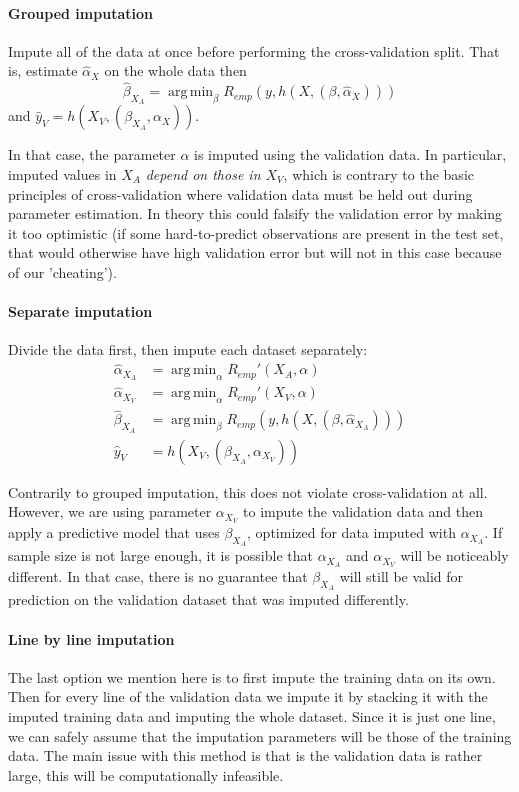 \documentclass[12pt, a4paper]{memoir}
\DeclareMathOperator*{\argmin}{arg\,min}
\begin{document}
\paragraph{Grouped imputation} Impute all of the data at once before performing the cross-validation split. That is, estimate $\hat{\alpha}_X$ on the whole data then $$\hat{\beta}_{X_A} = \argmin_{\beta} R_{emp}(y, h(X, (\beta, \hat{\alpha}_X)))$$
 and $\hat{y}_V = h(X_V, (\beta_{X_A}, \alpha_X))$. 

In that case, the parameter $\alpha$ is imputed using the validation data. In particular, imputed values in $X_A$ \emph{depend on those in $X_V$}, which is contrary to the basic principles of cross-validation where validation data must be held out during parameter estimation. In theory this could falsify the validation error by making it too optimistic (if some hard-to-predict observations are present in the test set, that would otherwise have high validation error but will not in this case because of our 'cheating').

\paragraph{Separate imputation}
Divide the data first, then impute each dataset separately:
\begin{align*}
\hat{\alpha}_{X_A} &= \argmin_{\alpha} R_{emp}'(X_A, \alpha) \\
\hat{\alpha}_{X_V} &= \argmin_{\alpha} R_{emp}'(X_V, \alpha) \\
\hat{\beta}_{X_A} &= \argmin_{\beta} R_{emp}(y, h(X, (\beta, \hat{\alpha}_{X_A}))) \\
\hat{y}_V &= h(X_V, (\beta_{X_A}, \alpha_{X_V}))
\end{align*}

Contrarily to grouped imputation, this does not violate cross-validation at all. However, we are using parameter $\alpha_{X_V}$ to impute the validation data and then apply a predictive model that uses $\beta_{X_A}$, optimized for data imputed with $\alpha_{X_A}$. If sample size is not large enough, it is possible that $\alpha_{X_A}$ and $\alpha_{X_V}$ will be noticeably different. In that case, there is no guarantee that $\beta_{X_A}$ will still be valid for prediction on the validation dataset that was imputed differently. 

\paragraph{Line by line imputation}
The last option we mention here is to first impute the training data on its own. Then for every line of the validation data we impute it by stacking it with the imputed training data and imputing the whole dataset. Since it is just one line, we can safely assume that the imputation parameters will be those of the training data. The main issue with this method is that is the validation data is rather large, this will be computationally infeasible.
\end{document}
